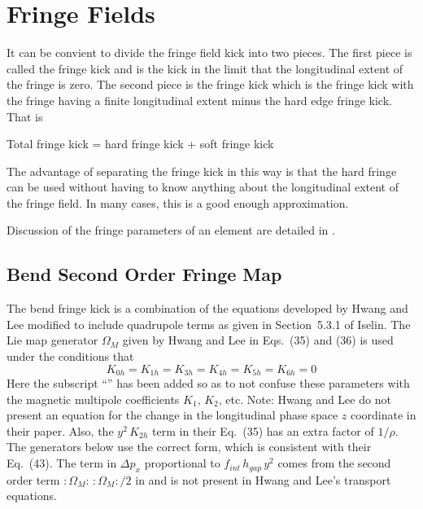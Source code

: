 \chapter{Fringe Fields}
\label{s:fringe.std}

It can be convient to divide the fringe field kick into two pieces. The first piece is called the  fringe kick and is the kick in the limit that the longitudinal extent of the fringe is
zero. The second piece is the  fringe kick which is the fringe kick with the fringe
having a finite longitudinal extent minus the hard edge fringe kick. That is
\begin{example}
  Total fringe kick = hard fringe kick + soft fringe kick
\end{example}
The advantage of separating the fringe kick in this way is that the hard fringe can be used without
having to know anything about the longitudinal extent of the fringe field. In many cases, this is a
good enough approximation.

Discussion of the fringe parameters of an element are detailed in .

\section{Bend Second Order Fringe Map}
\label{s:fringe.bend.hard}

The bend fringe kick is a combination of the equations developed by Hwang and Lee\cite{b:hwang}
modified to include quadrupole terms as given in Section~5.3.1 of Iselin\cite{b:madphysics}. The Lie
map generator $\Omega_M$ given by Hwang and Lee in Eqs.~(35) and (36) is used under the conditions
that
\begin{equation}
  K_{0h} = K_{1h} = K_{3h} = K_{4h} = K_{5h} = K_{6h} = 0
\end{equation}
Here the subscript ``'' has been added so as to not confuse these parameters with the magnetic
multipole coefficients $K_1$, $K_2$, etc. Note: Hwang and Lee do not present an equation for the
change in the longitudinal phase space $z$ coordinate in their paper. Also, the $y^2 \, K_{2h}$ term
in their Eq.~(35) has an extra factor of $1/\rho$. The generators below use the correct form, which
is consistent with their Eq.~(43). The term in $\Delta p_x$ proportional to $f_{int} \, h_{gap} \, y^2$
comes from the second order term $\colon\Omega_M\colon \, \colon\Omega_M\colon / 2$ in
 and is not present in Hwang and Lee's transport equations.

